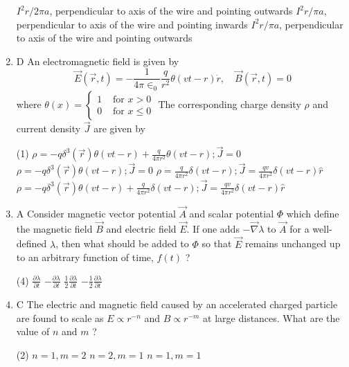 \begin{enumerate}
\begin{tasks}
		\task[\textbf{B.}]$I^{2} r / 2 \pi a$, perpendicular to axis of the wire and pointing outwards
		\task[\textbf{C.}]$I^{2} r / \pi a$, perpendicular to axis of the wire and pointing inwards
		\task[\textbf{D.}]$I^{2} r / \pi a$, perpendicular to axis of the wire and pointing outwards
	\end{tasks}
\item D An electromagnetic field is given by
$$
\vec{E}(\vec{r}, t)=-\frac{1}{4 \pi \in_{0}} \frac{q}{r^{2}} \theta(v t-r) \dot{r}, \quad \vec{B}(\vec{r}, t)=0
$$
where $\theta(x)= \begin{cases}1 & \text { for } x>0 \\ 0 & \text { for } x \leq 0\end{cases}$
The corresponding charge density $\rho$ and current density $\vec{J}$ are given by
{}
 \begin{tasks}(1)
	\task[\textbf{a.}]$\rho=-q \delta^{3}(\vec{r}) \theta(v t-r)+\frac{q}{4 \pi r^{2}} \theta(v t-r) ; \vec{J}=0$
	\task[\textbf{b.}]$\rho=-q \delta^{3}(\vec{r}) \theta(v t-r) ; \vec{J}=0$
	\task[\textbf{c.}]$\rho=\frac{q}{4 \pi r^{2}} \delta(v t-r) ; \vec{J}=\frac{q v}{4 \pi r^{2}} \delta(v t-r) \hat{r}$
	\task[\textbf{d.}] $\rho=-q \delta^{3}(\vec{r}) \theta(v t-r)+\frac{q}{4 \pi r^{2}} \delta(v t-r) ; \vec{J}=\frac{q v}{4 \pi r^{2}} \delta(v t-r) \hat{r}$
\end{tasks}
\item A Consider magnetic vector potential $\vec{A}$ and scalar potential $\Phi$ which define the magnetic field $\vec{B}$ and electric field $\vec{E}$. If one adds $-\vec{\nabla} \lambda$ to $\vec{A}$ for a well-defined $\lambda$, then what should be added to $\Phi$ so that $\vec{E}$ remains unchanged up to an arbitrary function of time, $f(t)$ ?
{}
 \begin{tasks}(4)
	\task[\textbf{a.}]$\frac{\partial \lambda}{\partial t}$
	\task[\textbf{b.}]$-\frac{\partial \lambda}{\partial t}$
	\task[\textbf{c.}] $\frac{1}{2} \frac{\partial \lambda}{\partial t}$
	\task[\textbf{d.}]  $-\frac{1}{2} \frac{\partial \lambda}{\partial t}$
\end{tasks}
\item C The electric and magnetic field caused by an accelerated charged particle are found to scale as $E \propto r^{-n}$ and $B \propto r^{-m}$ at large distances. What are the value of $n$ and $m$ ?
{}
 \begin{tasks}(2)
	\task[\textbf{a.}]$n=1, m=2$
	\task[\textbf{b.}]$n=2, m=1$
	\task[\textbf{c.}]$n=1, m=1$

\end{tasks}
\end{enumerate}
